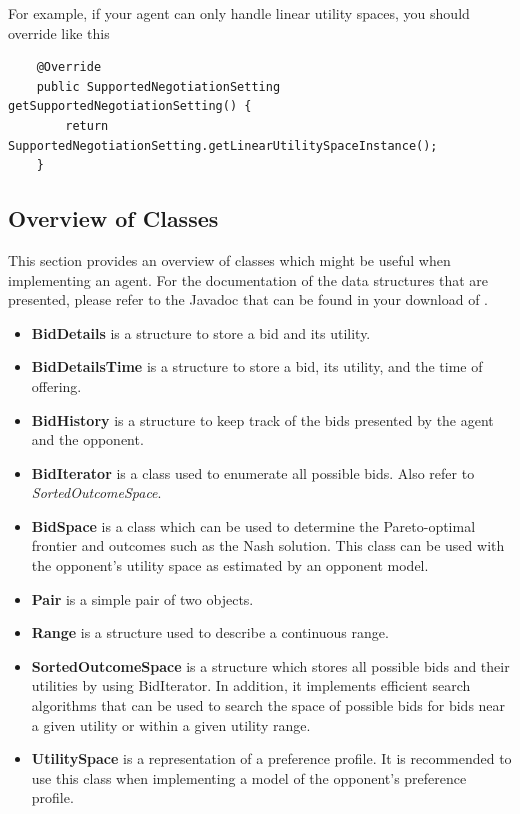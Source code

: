 \documentclass[]{article}
\begin{document}
For example, if your agent can only handle linear utility spaces, you should override like this

\begin{lstlisting}
	@Override
	public SupportedNegotiationSetting getSupportedNegotiationSetting() {
		return SupportedNegotiationSetting.getLinearUtilitySpaceInstance();
	}
\end{lstlisting}

\subsection{Overview of Classes}
This section provides an overview of classes which might be useful when implementing an agent. For the documentation of the data structures that are presented, please refer to the Javadoc that can be found in your download of \Genius. 

\begin{itemize}

\item \textbf{BidDetails} is a structure to store a bid and its utility.
\item \textbf{BidDetailsTime} is a structure to store a bid, its utility, and the time of offering.
\item \textbf{BidHistory} is a structure to keep track of the bids presented by the agent and the opponent.
\item \textbf{BidIterator} is a class used to enumerate all possible bids. Also refer to \textit{SortedOutcomeSpace}.
\item \textbf{BidSpace} is a class which can be used to determine the Pareto-optimal frontier and outcomes such as the Nash solution. This class can be used with the opponent's utility space as estimated by an opponent model.
\item \textbf{Pair} is a simple pair of two objects.
\item \textbf{Range} is a structure used to describe a continuous range.
\item \textbf{SortedOutcomeSpace} is a structure which stores all possible bids and their utilities by using BidIterator. In addition, it implements efficient search algorithms that can be used to search the space of possible bids for bids near a given utility or within a given utility range.
\item \textbf{UtilitySpace} is a representation of a preference profile. It is recommended to use this class when implementing a model of the opponent's preference profile.
\end{itemize}
\end{document}
